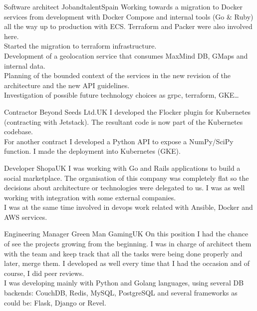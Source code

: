 \documentclass[12pt, a4paper, sans]{moderncv}
\begin{document}
\makecvtitle


%
%

{Software architect}
{Jobandtalent}{Spain}{}
{Working towards a migration to Docker services from development with
  Docker Compose and internal tools (Go \& Ruby) all the way up to
  production with ECS. Terraform and Packer were also involved here.\\
  Started the migration to terraform infrastructure.\\
Development of a geolocation service that consumes MaxMind DB, GMaps and
internal data.\\
Planning of the bounded context of the services in the new revision of the
architecture and the new API guidelines.\\
Investigation of possible future technology choices as grpc, terraform, GKE\ldots\\}

{Contractor}
{Beyond Seeds Ltd.}{UK}{}
{I developed the Flocker plugin for Kubernetes (contracting with Jetstack). The resultant code is now part of the Kubernetes codebase.\\
For another contract I developed a Python API to expose a NumPy/SciPy function. I made the deployment into Kubernetes (GKE).\\}

{Developer}
{Shopa}{UK}{}
{I was working with Go and Rails applications to build a social marketplace. The
organisation of this company was completely flat so the decisions about
architecture or technologies were delegated to us. I was as well working with
integration with some external companies.\\I was at the same time involved in
devops work related with Ansible, Docker and AWS services.\\}

{Engineering Manager}
{Green Man Gaming}{UK}{}
{On this position I had the chance of see the projects growing from the
beginning. I was in charge of architect them with the team and keep track that
all the tasks were being done properly and later, merge them. I developed  as
well every time that I had the occasion and of course, I did peer reviews.\\I
was developing mainly with Python and Golang languages, using several DB
backends: CouchDB, Redis, MySQL, PostgreSQL and several frameworks as could be:
Flask, Django or Revel.\\}
\end{document}
